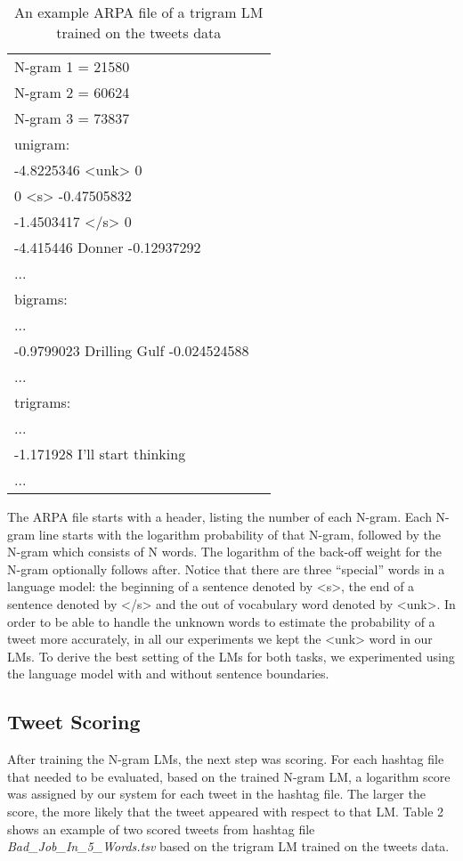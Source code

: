 \documentclass[11pt,a4paper]{article}
\begin{document}
\begin{table}[h!]
\begin{tabular}{ |l |c|}
\hline
N-gram 1 = 21580 \\
N-gram 2 = 60624 \\
N-gram 3 = 73837 \\
\hline
unigram:\\
-4.8225346   \textless unk\textgreater{}   0 \\
0   \textless s\textgreater{}   -0.47505832 \\
-1.4503417   \textless /s\textgreater{}   0 \\
-4.415446   Donner  -0.12937292 \\
...\\
\hline
bigrams:\\
...\\
-0.9799023  Drilling Gulf -0.024524588\\
...\\
\hline
trigrams:\\
...\\
-1.171928 I'll start thinking\\
...\\
\hline
\end{tabular}
\caption{An example ARPA file of a trigram LM trained on the tweets data}
\label{table:1}
\end{table}

The ARPA file starts with a header, listing the number of each N-gram. Each N-gram line starts with the logarithm probability of that N-gram, followed by the N-gram which consists of N words. The logarithm of the back-off weight for the N-gram optionally follows after. Notice that there are three ``special'' words in a language model: the beginning of a sentence denoted by \textless s\textgreater, the end of a sentence denoted by \textless /s\textgreater{} and the out of vocabulary word denoted by \textless unk\textgreater. In order to be able to handle the unknown words to estimate the probability of a tweet more accurately, in all our experiments we kept the \textless unk\textgreater{} word in our LMs. To derive the best setting of the LMs for both tasks, we experimented using the language model with and without sentence boundaries.

\subsection{Tweet Scoring}
After training the N-gram LMs, the next step was scoring. For each hashtag file that needed to be evaluated, based on the trained N-gram LM, a logarithm score was assigned by our system for each tweet in the hashtag file. The larger the score, the more likely that the tweet appeared with respect to that LM. Table 2 shows an example of two scored tweets from hashtag file \textit{Bad\_Job\_In\_5\_Words.tsv} based on the trigram LM trained on the tweets data.
\end{document}
